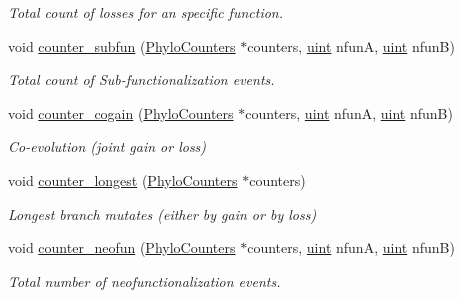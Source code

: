 \begin{Indent}
\begin{DoxyCompactItemize}
\begin{DoxyCompactList}\small\item\em Total count of losses for an specific function. \end{DoxyCompactList}\item 
void \hyperlink{namespacebarry_1_1counters_1_1phylo_a1bc5928ddc9cd008f04de022ad9d784e}{counter\+\_\+subfun} (\hyperlink{namespacebarry_1_1counters_1_1phylo_a4e401ffe66d04091343dcffaf915f8c3}{Phylo\+Counters} $\ast$counters, \hyperlink{namespacebarry_a11dfc53ddb4672278319aa04f1e09a6c}{uint} nfunA, \hyperlink{namespacebarry_a11dfc53ddb4672278319aa04f1e09a6c}{uint} nfunB)
\begin{DoxyCompactList}\small\item\em Total count of Sub-\/functionalization events. \end{DoxyCompactList}\item 
void \hyperlink{namespacebarry_1_1counters_1_1phylo_a7b614c5e464ad5a20740c77ab1f1c206}{counter\+\_\+cogain} (\hyperlink{namespacebarry_1_1counters_1_1phylo_a4e401ffe66d04091343dcffaf915f8c3}{Phylo\+Counters} $\ast$counters, \hyperlink{namespacebarry_a11dfc53ddb4672278319aa04f1e09a6c}{uint} nfunA, \hyperlink{namespacebarry_a11dfc53ddb4672278319aa04f1e09a6c}{uint} nfunB)
\begin{DoxyCompactList}\small\item\em Co-\/evolution (joint gain or loss) \end{DoxyCompactList}\item 
void \hyperlink{namespacebarry_1_1counters_1_1phylo_ae4ace7c30011a6d7047a94fd0ddf2df2}{counter\+\_\+longest} (\hyperlink{namespacebarry_1_1counters_1_1phylo_a4e401ffe66d04091343dcffaf915f8c3}{Phylo\+Counters} $\ast$counters)
\begin{DoxyCompactList}\small\item\em Longest branch mutates (either by gain or by loss) \end{DoxyCompactList}\item 
void \hyperlink{namespacebarry_1_1counters_1_1phylo_a54cb8c96750fcde91b0e7c95b54f5fc5}{counter\+\_\+neofun} (\hyperlink{namespacebarry_1_1counters_1_1phylo_a4e401ffe66d04091343dcffaf915f8c3}{Phylo\+Counters} $\ast$counters, \hyperlink{namespacebarry_a11dfc53ddb4672278319aa04f1e09a6c}{uint} nfunA, \hyperlink{namespacebarry_a11dfc53ddb4672278319aa04f1e09a6c}{uint} nfunB)
\begin{DoxyCompactList}\small\item\em Total number of neofunctionalization events. \end{DoxyCompactList}\end{DoxyCompactItemize}
\end{Indent}


